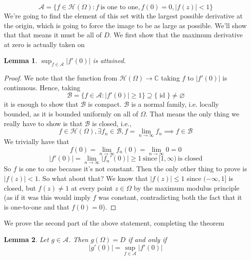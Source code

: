 \documentclass{article}
\newtheorem{lemma}{Lemma}
\newcommand{\mbb}[1]{\mathbb{#1}}
\newcommand{\mc}[1]{\mathcal{#1}}
\DeclareMathOperator{\Id}{id}
\begin{document}
\[\mc{A} = \{f \in \mc{H}(\Omega) : f \ \text{is one to one}, f(0) = 0, |f(z)| < 1\}\]
We're going to find the element of this set with the largest possible derivative at the origin, which is going to force the image to be as large as possible. We'll show that that means it must be all of \(D\).
We first show that the maximum derivative at zero is actually taken on
\begin{lemma}
\(\sup_{f \in \mc{A}}|f'(0)|\) is attained.
\end{lemma}
\begin{proof}
We note that the function from \(\mc{H}(\Omega) \to \mbb{C}\) taking \(f\) to \(|f'(0)|\) is continuous. Hence, taking
\[\mc{B} = \{f \in \mc{A} : |f'(0) | \geq 1\} \supseteq \{\Id\} \neq \varnothing\]
it is enough to show that \(\mc{B}\) is compact. \(\mc{B}\) is a normal family, i.e. locally bounded, as it is bounded uniformly on all of \(\Omega\). That means the only thing we really have to show is that \(\mc{B}\) is closed, i.e.,
\[f \in \mc{H}(\Omega), \exists f_n \in \mc{B}, f = \lim_{n \to \infty}f_n \implies f \in \mc{B}\]
We trivially have that
\[f(0) = \lim_{n \to \infty}f_n(0) = \lim_{n \to \infty}0 = 0\]
\[|f'(0)| = \lim_{n \to \infty}|f_n'(0)| \geq 1 \ \text{since} \ [1, \infty) \ \text{is closed}\]
So \(f\) is one to one because it's not constant. Then the only other thing to prove is \(|f(z)| < 1\). So what about that? We know that \(|f(z)| \leq 1\) since \((-\infty, 1]\) is closed, but \(f(z) \neq 1\) at every point \(z \in \Omega\) by the maximum modulus principle (as if it was this would imply \(f\) was constant, contradicting both the fact that it is one-to-one and that \(f(0) = 0\)).
\end{proof}
We prove the second part of the above statement, completing the theorem
\begin{lemma}
Let \(g \in \mc{A}\). Then \(g(\Omega) = D\) if and only if
\[|g'(0)| = \sup_{f \in \mc{A}}|f'(0)|\]
\end{lemma}
\end{document}
